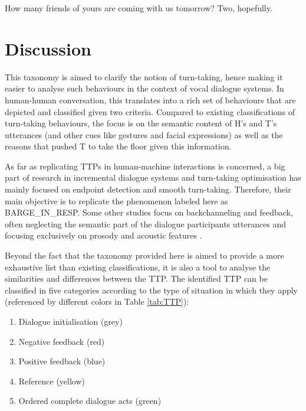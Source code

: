                     	\begin{dialogue}
							 How many friends of yours are coming with us tomorrow?
							 Two, hopefully.
						\end{dialogue}

\section{Discussion}
\label{sec:discussion}

	This taxonomy is aimed to clarify the notion of turn-taking, hence making it easier to analyse such behaviours in the context of vocal dialogue systems. In human-human conversation, this translates into a rich set of behaviours that are depicted and classified given two criteria. Compared to existing classifications of turn-taking behaviours, the focus is on the semantic content of H's and T's utterances (and other cues like gestures and facial expressions) as well as the reasons that pushed T to take the floor given this information.

    As far as replicating TTPs in human-machine interactions is concerned, a big part of research in incremental dialogue systems and turn-taking optimisation has mainly focused on endpoint detection \cite{Raux2008} and smooth turn-taking. Therefore, their main objective is to replicate the phenomenon labeled here as BARGE\_IN\_RESP. Some other studies focus on backchanneling and feedback, often neglecting the semantic part of the dialogue participants utterances and focusing exclusively on prosody and acoustic features \cite{Baumann2008,Jonsdottir2008}.

    Beyond the fact that the taxonomy provided here is aimed to provide a more exhaustive list than existing classifications, it is also a tool to analyse the similarities and differences between the TTP. The identified TTP can be classified in five categories according to the type of situation in which they apply (referenced by different colors in Table \ref{tab:TTP}):
    
    \begin{enumerate}
      \item Dialogue initialisation (grey)
      \item Negative feedback (red)
      \item Positive feedback (blue)
      \item Reference (yellow)
      \item Ordered complete dialogue acts (green)
    \end{enumerate}

